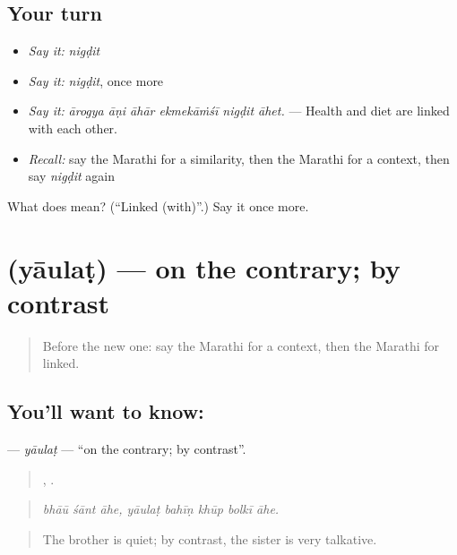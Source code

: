\subsection*{Your turn}
\begin{itemize}
\raggedright
  \item \emph{Say it:} \emph{nigḍit}
  \item \emph{Say it:} \emph{nigḍit}, once more
  \item \emph{Say it:} \emph{ārogya āṇi āhār ekmekāṁśī nigḍit āhet.} — Health and diet are linked with each other.
  \item \emph{Recall:} say the Marathi for a similarity, then the Marathi for a context, then say \emph{nigḍit} again
\end{itemize}

\begin{tcolorbox}[breakable,colback=teal!4,colframe=teal!35!black,title={Before you move on}]
What does  mean? (\textquotedblleft{}Linked (with)\textquotedblright{}.) Say it once more.
\end{tcolorbox}
\section[\texorpdfstring{\mr{याउलट} (yāulaṭ)}{याउलट (yāulaṭ)}]{ (yāulaṭ) — on the contrary; by contrast}

\label{lesson:MR-C348-yaulat}



\begin{quote}
Before the new one: say the Marathi for a context, then the Marathi for linked.
\end{quote}

\subsection*{You'll want to know: }
\textbf{} — \emph{yāulaṭ} — \textquotedblleft{}on the contrary; by contrast\textquotedblright{}.

\begin{quote}
  ,     .
\end{quote}

\begin{quote}
\emph{bhāū śānt āhe, yāulaṭ bahīṇ khūp bolkī āhe.}
\end{quote}

\begin{quote}
The brother is quiet; by contrast, the sister is very talkative.
\end{quote}

